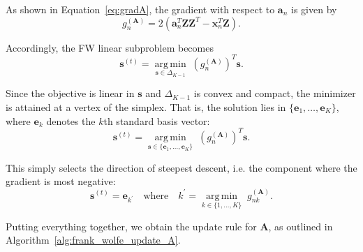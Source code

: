 \documentclass{article}
\DeclareMathOperator*{\argmin}{arg\,min}
\begin{document}
As shown in Equation~\ref{eq:gradA}, the gradient with respect to $\mathbf{a}_n$ is given by\begin{equation}
    g_n^{(\mathbf{A})} = 2 \left( \mathbf{a}_n^T \mathbf{Z} \mathbf{Z}^T - \mathbf{x}_n^T \mathbf{Z} \right).
\end{equation}

Accordingly, the FW linear subproblem becomes\begin{equation}
    \mathbf{s}^{(t)} = \underset{\mathbf{s} \in \Delta_{K-1}}{\argmin} \;\left( g_n^{(\mathbf{A})} \right)^T \mathbf{s}.
\end{equation}

Since the objective is linear in $\mathbf{s}$ and $\Delta_{K-1}$ is convex and compact, the minimizer is attained at a vertex of the simplex. That is, the solution lies in $\{\mathbf{e}_1, \ldots, \mathbf{e}_K\}$, where $\mathbf{e}_k$ denotes the $k$th standard basis vector:\begin{equation}
    \mathbf{s}^{(t)} = \underset{\mathbf{s} \in \{\mathbf{e}_1, \ldots, \mathbf{e}_K\}}{\argmin} \;\left( g_n^{(\mathbf{A})} \right)^T \mathbf{s}.
\end{equation}

This simply selects the direction of steepest descent, i.e. the component where the gradient is most negative:\begin{equation}
    \mathbf{s}^{(t)} = \mathbf{e}_{k^\prime} \quad \text{where} \quad
    k^\prime = \underset{k \in \{1, \ldots, K\}}{\argmin} \; g_{nk}^{(\mathbf{A})}.
\end{equation}

Putting everything together, we obtain the update rule for $\mathbf{A}$, as outlined in Algorithm~\ref{alg:frank_wolfe_update_A}.
\end{document}
